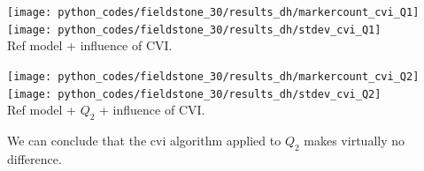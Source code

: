 \begin{center}
\texttt{[image: python\_codes/fieldstone\_30/results\_dh/markercount\_cvi\_Q1]}
\texttt{[image: python\_codes/fieldstone\_30/results\_dh/stdev\_cvi\_Q1]}\\
{\captionfont Ref model + influence of CVI.}
\end{center}

\begin{center}
\texttt{[image: python\_codes/fieldstone\_30/results\_dh/markercount\_cvi\_Q2]}
\texttt{[image: python\_codes/fieldstone\_30/results\_dh/stdev\_cvi\_Q2]}\\
{\captionfont Ref model + $Q_2$ + influence of CVI.}
\end{center}

We can conclude that the cvi algorithm applied to $Q_2$ makes virtually no difference.
















